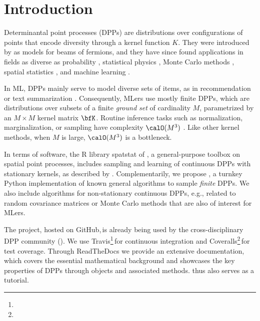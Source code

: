 \documentclass[twoside,11pt]{article}
\begin{document}
\vspace{-1em}
\section{Introduction} %
\label{sec:introduction}

    Determinantal point processes (DPPs) are distributions over configurations of points that encode diversity through a kernel function $K$.
    They were introduced by \citet{Mac75} as models for beams of fermions, and they have since found applications in fields as diverse as probability \citep{Sos00, Kon05, HKPV06}, statistical physics \citep{PaBe11}, Monte Carlo methods \citep{BaHa19}, spatial statistics \citep{LaMoRu15}, and machine learning \citep[ML,][]{KuTa12}.

    In ML, DPPs mainly serve to model diverse sets of items, as in recommendation \citep{KaDeKo16, GaPaKo16} or text summarization \citep{DuBa18}.
    Consequently, MLers  use mostly finite DPPs, which are distributions over subsets of a finite \emph{ground set} of cardinality $M$, parametrized by an $M\times M$ kernel matrix $\bfK$.
    Routine inference tasks such as normalization, marginalization, or sampling have complexity $\calO(M^3)$ \citep{Gil14}.
    Like other kernel methods, when $M$ is large, $\calO(M^3)$ is a bottleneck.

    In terms of software, the R library \textsf{spatstat} of \citet{BaTu05}, a general-purpose toolbox on spatial point processes, includes sampling and learning of continuous DPPs with stationary kernels, as described by .
    Complementarily, we propose \DPPy, a turnkey Python implementation of known general algorithms to sample \emph{finite} DPPs.
    We also include algorithms for non-stationary continuous DPPs, e.g., related to random covariance matrices or Monte Carlo methods that are also of interest for MLers.

    The \DPPy project, hosted on GitHub,\,is already being used by the cross-disciplinary DPP community (\citealp{BuRaWi19,Kam18,Pou19,DeCaVa19,GaBaVa19}).
    We use Travis\hspace{-1pt}\footnote{\footTravis}\,for continuous integration and Coveralls\hspace{-1pt}\footnote{\footCoveralls}\,for test coverage.
    Through ReadTheDocs\,\,we provide an extensive documentation, which covers the essential mathematical background and showcases the key properties of DPPs through \DPPy objects and associated methods.
    \DPPy thus also serves as a tutorial.
\end{document}
